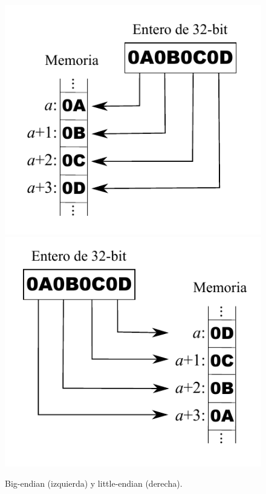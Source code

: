 \begin{figure}[H]
	\noindent \begin{centering}
		\includegraphics[width=\linewidth/3]{capitulo5/big_endian}
		\includegraphics[width=\linewidth/3]{capitulo5/little_endian}
		\par\end{centering}
	\smallskip
	\caption[Big-endian y little-endian]{\label{fig:endianness} Big-endian (izquierda) y little-endian (derecha). \cite{wiki_endianness}}
\end{figure}
	
